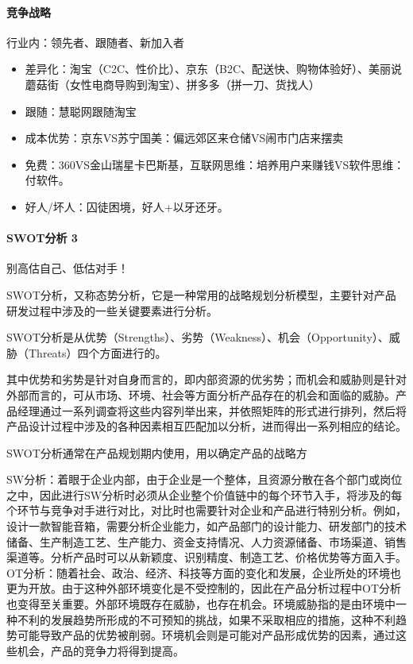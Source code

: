 \documentclass[letterpaper,11pt,english]{sphinxmanual}
\begin{document}
\paragraph{竞争战略}
\label{\detokenize{chapter_skill/compete_analysis:id6}}
行业内：领先者、跟随者、新加入者
\begin{itemize}
\item {} 
差异化：淘宝（C2C、性价比）、京东（B2C、配送快、购物体验好）、美丽说蘑菇街（女性电商导购到淘宝）、拼多多（拼一刀、货找人）

\item {} 
跟随：慧聪网跟随淘宝

\item {} 
成本优势：京东VS苏宁国美：偏远郊区来仓储VS闹市门店来摆卖

\item {} 
免费：360VS金山瑞星卡巴斯基，互联网思维：培养用户来赚钱VS软件思维：付软件。

\item {} 
好人/坏人：囚徒困境，好人+以牙还牙。

\end{itemize}


\paragraph{SWOT分析 3\sphinxfootnotemark[173]}
\label{\detokenize{chapter_skill/compete_analysis:swot-3}}%
\begin{footnotetext}[173]\sphinxAtStartFootnote
{}
%
\end{footnotetext}\ignorespaces 
别高估自己、低估对手！

SWOT分析，又称态势分析，它是一种常用的战略规划分析模型，主要针对产品研发过程中涉及的一些关键要素进行分析。

SWOT分析是从优势（Strengths）、劣势（Weakness）、机会（Opportunity）、威胁（Threats）四个方面进行的。

其中优势和劣势是针对自身而言的，即内部资源的优劣势；而机会和威胁则是针对外部而言的，可从市场、环境、社会等方面分析产品存在的机会和面临的威胁。产品经理通过一系列调查将这些内容列举出来，并依照矩阵的形式进行排列，然后将产品设计过程中涉及的各种因素相互匹配加以分析，进而得出一系列相应的结论。

SWOT分析通常在产品规划期内使用，用以确定产品的战略方

SW分析：着眼于企业内部，由于企业是一个整体，且资源分散在各个部门或岗位之中，因此进行SW分析时必须从企业整个价值链中的每个环节入手，将涉及的每个环节与竞争对手进行对比，对比时也需要针对企业和产品进行特别分析。例如，设计一款智能音箱，需要分析企业能力，如产品部门的设计能力、研发部门的技术储备、生产制造工艺、生产能力、资金支持情况、人力资源储备、市场渠道、销售渠道等。分析产品时可以从新颖度、识别精度、制造工艺、价格优势等方面入手。
OT分析：随着社会、政治、经济、科技等方面的变化和发展，企业所处的环境也更为开放。由于这种外部环境变化是不受控制的，因此在产品分析过程中OT分析也变得至关重要。外部环境既存在威胁，也存在机会。环境威胁指的是由环境中一种不利的发展趋势所形成的不可预知的挑战，如果不采取相应的措施，这种不利趋势可能导致产品的优势被削弱。环境机会则是可能对产品形成优势的因素，通过这些机会，产品的竞争力将得到提高。
\end{document}
